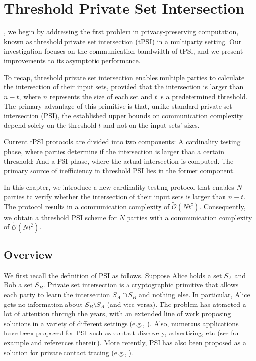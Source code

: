 
\chapter{Threshold Private Set Intersection}
\label{sec:threshpsi}
, we begin by addressing the first problem in privacy-preserving computation, known as threshold private set intersection (tPSI) in a multiparty setting. Our investigation focuses on the communication bandwidth of tPSI, and we present improvements to its asymptotic performance.

To recap, threshold private set intersection enables multiple parties to calculate the intersection of their input sets, provided that the intersection is larger than $n-t$, where $n$ represents the size of each set and $t$ is a predetermined threshold. The primary advantage of this primitive is that, unlike standard private set intersection (PSI), the established upper bounds on communication complexity depend solely on the threshold $t$ and not on the input sets' sizes.
   
Current tPSI protocols are divided into two components: A cardinality testing phase, where parties determine if the intersection is larger than a certain threshold; And a PSI phase, where the actual intersection is computed. The primary source of inefficiency in threshold PSI lies in the former component.

In this chapter, we introduce a new cardinality testing protocol that enables $N$ parties to verify whether the intersection of their input sets is larger than $n-t$. The protocol results in a communication complexity of $\tilde{\mathcal{O}}(Nt^2)$. Consequently, we obtain a threshold PSI scheme for $N$ parties with a communication complexity of $\tilde{\mathcal{O}}(Nt^2)$.


\section{Overview}
We first recall the definition of PSI as follows.
Suppose Alice holds a set $S_A$ and Bob a set $S_B$. 
Private set intersection is a cryptographic primitive that allows each party to learn the intersection $S_A\cap S_B$ and nothing else. In particular, Alice gets no information about $S_B\setminus S_A$ (and vice-versa). The problem has attracted a lot of attention through the years, with an extended line of work proposing solutions in a variety of different settings (e.g., \cite{IEEESP:Meadows86,EC:FreNisPin04,C:KisSon05,ACNS:DMRY09,AC:DeCKimTsu10,CCS:DonCheWen13,USENIX:PinSchZoh14,USENIX:PSSZ15,CCS:KKRT16,EC:RinRos17,PKC:HazVen17,CCS:RinRos17,EC:PSWW18,EC:GhoNil19,C:GhoSim19,C:PRTY19}). Also, numerous applications have been proposed for PSI such as contact discovery, advertising, etc (see for example \cite{EPRINT:IKNPSS17} and references therein). More recently, PSI has also been proposed as a solution for private contact tracing (e.g., \cite{berke2020assessing}). 

